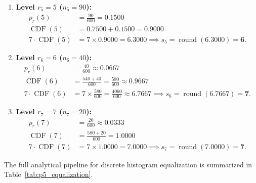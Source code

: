 \documentclass[11pt,a4paper]{article}
\begin{document}
\begin{enumerate}
\begin{align}
    \operatorname{CDF}(4) &= 0.5500 + 0.2000 = 0.7500 \\
    7 \cdot \operatorname{CDF}(4) &= 7 \times 0.7500 = 5.2500 \implies s_4 = \operatorname{round}(5.2500) = \mathbf{5}.
    \end{align}
    \item \textbf{Level $r_5 = 5$ ($n_5 = 90$):}
    \begin{align}
    p_r(5) &= \frac{90}{600} = 0.1500 \\
    \operatorname{CDF}(5) &= 0.7500 + 0.1500 = 0.9000 \\
    7 \cdot \operatorname{CDF}(5) &= 7 \times 0.9000 = 6.3000 \implies s_5 = \operatorname{round}(6.3000) = \mathbf{6}.
    \end{align}
    \item \textbf{Level $r_6 = 6$ ($n_6 = 40$):}
    \begin{align}
    p_r(6) &= \frac{40}{600} \approx 0.0667 \\
    \operatorname{CDF}(6) &= \frac{540 + 40}{600} = \frac{580}{600} \approx 0.9667 \\
    7 \cdot \operatorname{CDF}(6) &= 7 \times \frac{580}{600} = \frac{4060}{600} \approx 6.7667 \implies s_6 = \operatorname{round}(6.7667) = \mathbf{7}.
    \end{align}
    \item \textbf{Level $r_7 = 7$ ($n_7 = 20$):}
    \begin{align}
    p_r(7) &= \frac{20}{600} \approx 0.0333 \\
    \operatorname{CDF}(7) &= \frac{580 + 20}{600} = 1.0000 \\
    7 \cdot \operatorname{CDF}(7) &= 7 \times 1.0000 = 7.0000 \implies s_7 = \operatorname{round}(7.0000) = \mathbf{7}.
    \end{align}
\end{enumerate}

The full analytical pipeline for discrete histogram equalization is summarized in Table~\ref{tab:p5_equalization}.
\end{document}
